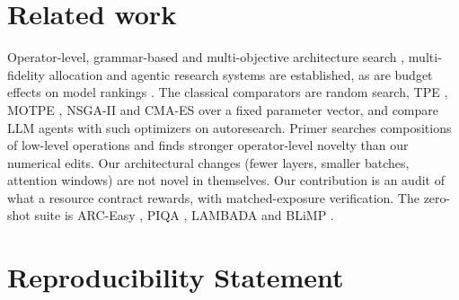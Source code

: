 \documentclass{article}
\begin{document}
\section{Related work}\label{app:related}
Operator-level, grammar-based and multi-objective architecture search \citep{primer,einspace,mote,monaq}, multi-fidelity allocation \citep{hyperband,bohb} and agentic research systems \citep{autodiscovery,mlestar,airesearcher,mledojo} are established, as are budget effects on model rankings \citep{dehghani2022efficiency,geiping2023cramming,hoffmann2022chinchilla}. The classical comparators are random search, TPE \citep{bergstra2011tpe}, MOTPE \citep{ozaki2020motpe}, NSGA-II \citep{deb2002nsga2} and CMA-ES \citep{hansen2001cmaes} over a fixed parameter vector, and \citet{ferreira} compare LLM agents with such optimizers on autoresearch. Primer searches compositions of low-level operations and finds stronger operator-level novelty than our numerical edits. Our architectural changes (fewer layers, smaller batches, attention windows) are not novel in themselves. Our contribution is an audit of what a resource contract rewards, with matched-exposure verification. The zero-shot suite is ARC-Easy \citep{clark2018arc}, PIQA \citep{bisk2020piqa}, LAMBADA \citep{paperno2016lambada} and BLiMP \citep{warstadt2020blimp}.

\section{Reproducibility Statement}\label{app:repro}
\end{document}
